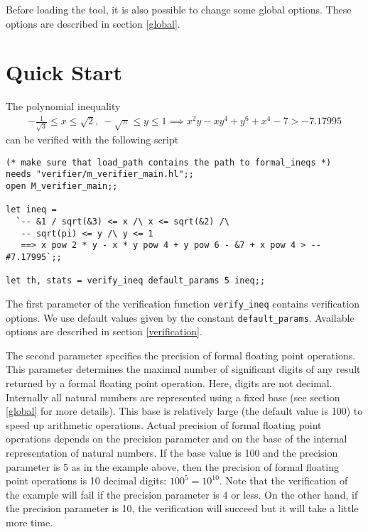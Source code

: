 \documentclass[a4paper]{article}
\begin{document}
Before loading the tool, it is also possible to change some global options. These options are described in section \ref{global}.


\section{Quick Start}

The polynomial inequality
\begin{multline*}
-\frac{1}{\sqrt{3}} \le x \le \sqrt{2},\ -\sqrt{\pi} \le y \le 1
\implies x^2 y - x y^4 + y^6 + x^4 - 7 > -7.17995
\end{multline*}
can be verified with the following script

\begin{verbatim}
(* make sure that load_path contains the path to formal_ineqs *)
needs "verifier/m_verifier_main.hl";;
open M_verifier_main;;

let ineq = 
  `-- &1 / sqrt(&3) <= x /\ x <= sqrt(&2) /\ 
   -- sqrt(pi) <= y /\ y <= 1
   ==> x pow 2 * y - x * y pow 4 + y pow 6 - &7 + x pow 4 > -- #7.17995`;;

let th, stats = verify_ineq default_params 5 ineq;;
\end{verbatim}

The first parameter of the verification function \verb|verify_ineq| contains verification options. We use default values given by the constant \verb|default_params|. Available options are described in section \ref{verification}.

The second parameter specifies the precision of formal floating point operations. This parameter determines the maximal number of significant digits of any result returned by a formal floating point operation. Here, digits are not decimal. Internally all natural numbers are represented using a fixed base (see section \ref{global} for more details). This base is relatively large (the default value is 100) to speed up arithmetic operations. Actual precision of formal floating point operations depends on the precision parameter and on the base of the internal representation of natural numbers. If the base value is 100 and the precision parameter is 5 as in the example above, then the precision of formal floating point operations is 10 decimal digits: $100^5 = 10^{10}$. Note that the verification of the example will fail if the precision parameter is 4 or less. On the other hand, if the precision parameter is 10, the verification will succeed but it will take a little more time.
\end{document}
